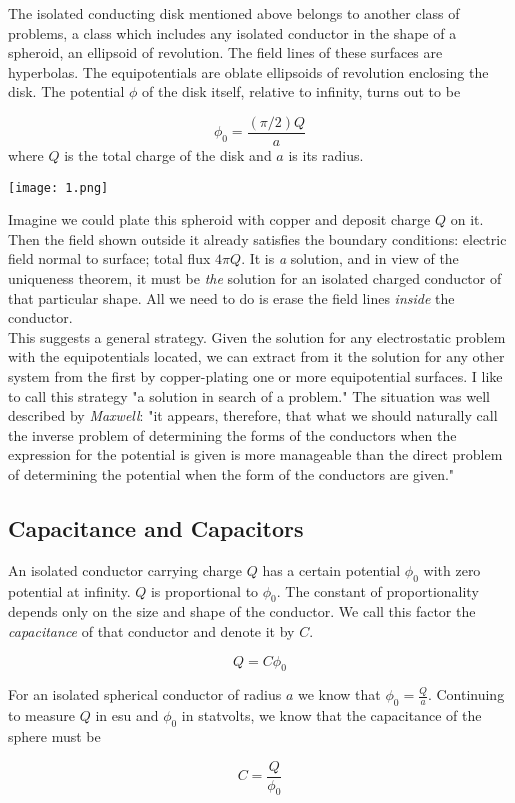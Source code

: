 \documentclass[svgnames]{article}
\begin{document}
The isolated conducting disk mentioned above belongs to another class of
problems, a class which includes any isolated conductor in the shape of
a spheroid, an ellipsoid of revolution. The field lines of these surfaces are
hyperbolas. The equipotentials are oblate ellipsoids of revolution enclosing
the disk. The potential $\phi$ of the disk itself, relative to infinity, turns
out to be 

\[
\phi_0 = \frac{(\pi / 2) Q}{a} 
\] 
where $Q$ is the total charge of the disk and $a$ is its radius. 

\begin{center}
\texttt{[image: 1.png]}
\end{center}

Imagine we could plate this spheroid with copper and deposit charge $Q$ on it.
Then the field shown outside it already satisfies the boundary conditions:
electric field normal to surface; total flux $4 \pi Q$. It is \textit{a}
solution, and in view of the uniqueness theorem, it must be \textit{the}
solution for an isolated charged conductor of that particular shape. All we
need to do is erase the field lines \textit{inside} the conductor. \\

This suggests a general strategy. Given the solution for any electrostatic
problem with the equipotentials located, we can extract from it the solution
for any other system from the first by copper-plating one or more
equipotential surfaces. I like to call this strategy "a solution in search 
of a problem." The situation was well described by \textit{Maxwell}: "it 
appears, therefore, that what we should naturally call the inverse problem 
of determining the forms of the conductors when the expression for the 
potential is given is more manageable than the direct problem of 
determining the potential when the form of the conductors are given." 

\subsection{Capacitance and Capacitors}

An isolated conductor carrying charge $Q$ has a certain potential $\phi_0$ with
zero potential at infinity. $Q$ is proportional to $\phi_0$. The constant of
proportionality depends only on the size and shape of the conductor. We call
this factor the \textit{capacitance} of that conductor and denote it by $C$.

\[
Q = C\phi_0
\] 

For an isolated spherical conductor of radius $a$ we know that $\phi_0
= \frac{Q}{a}$. Continuing to measure $Q$ in esu and $\phi_0$ in statvolts, we
know that the capacitance of the sphere must be \\
\begin{tcolorbox}
\[
C = \frac{Q}{\phi_0}
\] 
\end{tcolorbox}
\end{document}
